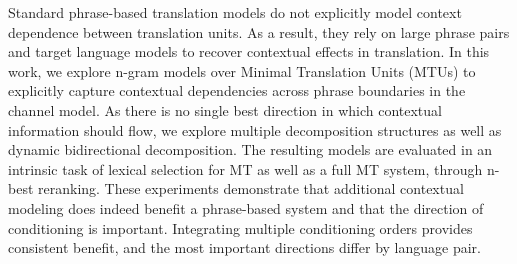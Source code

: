 Standard phrase-based translation models do not explicitly model context dependence between translation units. As a result, they rely on large phrase
 pairs and target language models to recover contextual effects in translation.
 In this work, we explore n-gram models over Minimal Translation Units (MTUs) to
 explicitly capture contextual dependencies across phrase boundaries in the
 channel model. As there is no single best direction in which contextual
 information should flow, we explore multiple decomposition structures as well
 as  dynamic bidirectional decomposition. The resulting models are evaluated in
 an intrinsic task of lexical selection for MT as well as a full MT system,
 through n-best reranking. These experiments demonstrate that additional
 contextual modeling does indeed benefit a phrase-based system and that the
 direction of conditioning is important. Integrating multiple conditioning
 orders provides consistent benefit, and the most important directions differ by
 language pair.

